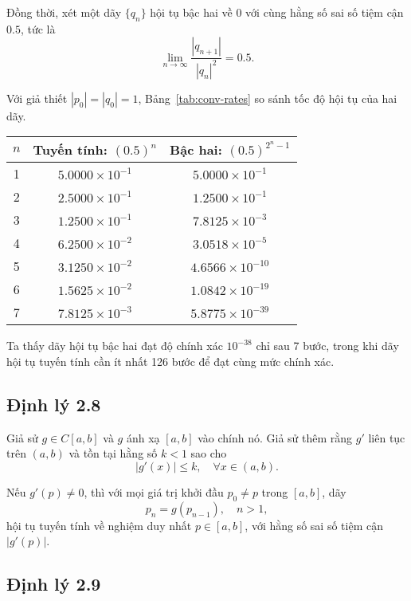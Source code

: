 Đồng thời, xét một dãy $\{q_n\}$ hội tụ bậc hai về $0$ với cùng hằng số sai số tiệm cận $0.5$, tức là
\[
\lim_{n \to \infty} \frac{|q_{n+1}|}{|q_n|^2} = 0.5.
\]

Với giả thiết $|p_0| = |q_0| = 1$, Bảng~\ref{tab:conv-rates} so sánh tốc độ hội tụ của hai dãy.

\begin{center}
\label{tab:conv-rates}
\begin{tabular}{|c|c|c|}
\hline
$n$ & Tuyến tính: $(0.5)^n$ & Bậc hai: $(0.5)^{2^n - 1}$ \\
\hline
1 & $5.0000 \times 10^{-1}$ & $5.0000 \times 10^{-1}$ \\
2 & $2.5000 \times 10^{-1}$ & $1.2500 \times 10^{-1}$ \\
3 & $1.2500 \times 10^{-1}$ & $7.8125 \times 10^{-3}$ \\
4 & $6.2500 \times 10^{-2}$ & $3.0518 \times 10^{-5}$ \\
5 & $3.1250 \times 10^{-2}$ & $4.6566 \times 10^{-10}$ \\
6 & $1.5625 \times 10^{-2}$ & $1.0842 \times 10^{-19}$ \\
7 & $7.8125 \times 10^{-3}$ & $5.8775 \times 10^{-39}$ \\
\hline
\end{tabular}
\end{center}

Ta thấy dãy hội tụ bậc hai đạt độ chính xác $10^{-38}$ chỉ sau 7 bước, 
trong khi dãy hội tụ tuyến tính cần ít nhất 126 bước để đạt cùng mức chính xác.


\subsection*{\textbf{Định lý 2.8}}

Giả sử $g \in C[a,b]$ và $g$ ánh xạ $[a,b]$ vào chính nó. 
Giả sử thêm rằng $g'$ liên tục trên $(a,b)$ và tồn tại hằng số $k < 1$ sao cho
\[
|g'(x)| \leq k, \quad \forall x \in (a,b).
\]

Nếu $g'(p) \neq 0$, thì với mọi giá trị khởi đầu $p_0 \neq p$ trong $[a,b]$, 
dãy
\[
p_n = g(p_{n-1}), \quad n > 1,
\]
hội tụ tuyến tính về nghiệm duy nhất $p \in [a,b]$, 
với hằng số sai số tiệm cận $|g'(p)|$.

\subsection*{\textbf{Định lý 2.9}}

